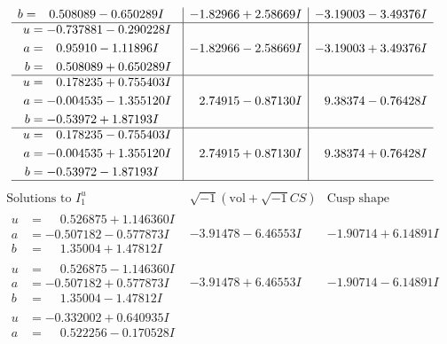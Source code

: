 \documentclass[1p]{elsarticle_modified}
\theoremstyle{definition}
\newcommand{\I}{\sqrt{-1}}
\begin{document}
$$\begin{array}{c|c|c}
\begin{aligned}
b &= \phantom{-}0.508089 - 0.650289 I\end{aligned}
 & -1.82966 + 2.58669 I & -3.19003 - 3.49376 I \\ \hline\begin{aligned}
u &= -0.737881 - 0.290228 I \\
a &= \phantom{-}0.95910 - 1.11896 I \\
b &= \phantom{-}0.508089 + 0.650289 I\end{aligned}
 & -1.82966 - 2.58669 I & -3.19003 + 3.49376 I \\ \hline\begin{aligned}
u &= \phantom{-}0.178235 + 0.755403 I \\
a &= -0.004535 - 1.355120 I \\
b &= -0.53972 + 1.87193 I\end{aligned}
 & \phantom{-}2.74915 - 0.87130 I & \phantom{-}9.38374 - 0.76428 I \\ \hline\begin{aligned}
u &= \phantom{-}0.178235 - 0.755403 I \\
a &= -0.004535 + 1.355120 I \\
b &= -0.53972 - 1.87193 I\end{aligned}
 & \phantom{-}2.74915 + 0.87130 I & \phantom{-}9.38374 + 0.76428 I\\
 \hline 
 \end{array}$$\newpage$$\begin{array}{c|c|c}  
\text{Solutions to }I^u_{1}& \I (\text{vol} + \sqrt{-1}CS) & \text{Cusp shape}\\
 \hline 
\begin{aligned}
u &= \phantom{-}0.526875 + 1.146360 I \\
a &= -0.507182 - 0.577873 I \\
b &= \phantom{-}1.35004 + 1.47812 I\end{aligned}
 & -3.91478 - 6.46553 I & -1.90714 + 6.14891 I \\ \hline\begin{aligned}
u &= \phantom{-}0.526875 - 1.146360 I \\
a &= -0.507182 + 0.577873 I \\
b &= \phantom{-}1.35004 - 1.47812 I\end{aligned}
 & -3.91478 + 6.46553 I & -1.90714 - 6.14891 I \\ \hline\begin{aligned}
u &= -0.332002 + 0.640935 I \\
a &= \phantom{-}0.522256 - 0.170528 I \\

\end{aligned}
\end{array}$$
\end{document}
